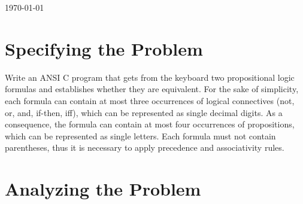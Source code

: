 \documentclass[11pt, a4paper, titlepage, block]{article}
\begin{document}
\begin{titlepage}

{\large \today}\\[10cm] %


 

\newpage

\end{titlepage}

\section{Specifying the Problem}
	Write an ANSI C program that gets from the keyboard two propositional logic formulas and
	establishes whether they are equivalent. For the sake of simplicity, each formula can contain at
	most three occurrences of logical connectives (not, or, and, if-then, iff), which can be represented
	as single decimal digits. As a consequence, the formula can contain at most four occurrences of
	propositions, which can be represented as single letters. Each formula must not contain parentheses,
	thus it is necessary to apply precedence and associativity rules.
	\newpage
\section{Analyzing the Problem}
\end{document}

